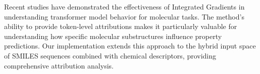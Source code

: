 \documentclass[preprint,12pt]{elsarticle}
\begin{document}
Recent studies have demonstrated the effectiveness of Integrated Gradients in understanding transformer model behavior for molecular tasks. The method's ability to provide token-level attributions makes it particularly valuable for understanding how specific molecular substructures influence property predictions. Our implementation extends this approach to the hybrid input space of SMILES sequences combined with chemical descriptors, providing comprehensive attribution analysis.






\end{document}

